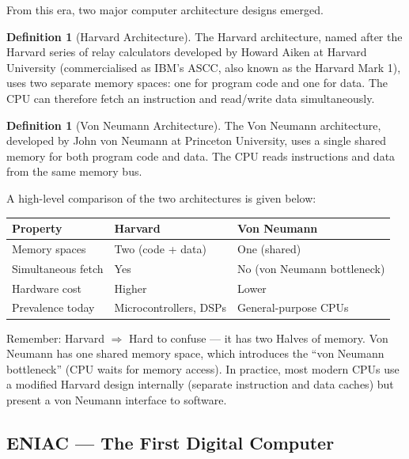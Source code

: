 \documentclass[11pt, a4paper, notitlepage]{report}
\theoremstyle{definition}
\newtheorem{definition}[theorem]{Definition}
\theoremstyle{remark}
\theoremstyle{definition}
\begin{document}
From this era, two major computer architecture designs emerged.

\begin{definition}[Harvard Architecture]
\label{def:harvard}
The Harvard architecture, named after the Harvard series of relay calculators developed by Howard Aiken at Harvard University (commercialised as IBM's ASCC, also known as the Harvard Mark 1), uses two separate memory spaces: one for program code and one for data. The CPU can therefore fetch an instruction and read/write data simultaneously.
\end{definition}

\begin{definition}[Von Neumann Architecture]
\label{def:vonneumann}
The Von Neumann architecture, developed by John von Neumann at Princeton University, uses a single shared memory for both program code and data. The CPU reads instructions and data from the same memory bus.
\end{definition}

A high-level comparison of the two architectures is given below:

\begin{center}
\begin{tabular}{lll}
\toprule
\textbf{Property} & \textbf{Harvard} & \textbf{Von Neumann} \\
\midrule
Memory spaces & Two (code + data) & One (shared) \\
Simultaneous fetch & Yes & No (von Neumann bottleneck) \\
Hardware cost & Higher & Lower \\
Prevalence today & Microcontrollers, DSPs & General-purpose CPUs \\
\bottomrule
\end{tabular}
\end{center}

\begin{examtip}[title={Identifying the Architectures}]
Remember: Harvard $\Rightarrow$ Hard to confuse --- it has two Halves of memory. Von Neumann has one shared memory space, which introduces the ``von Neumann bottleneck'' (CPU waits for memory access). In practice, most modern CPUs use a modified Harvard design internally (separate instruction and data caches) but present a von Neumann interface to software.
\end{examtip}

\subsection{ENIAC --- The First Digital Computer}
\end{document}
